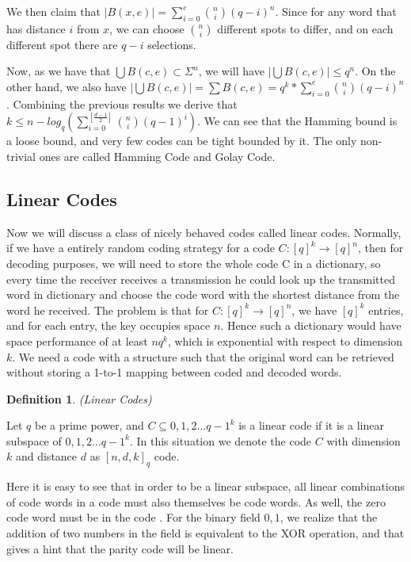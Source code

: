\documentclass{article}
\newtheorem{Definition}{Definition}
\begin{document}
We then claim that $|B(x,e)| = \sum_{i=0}^{e} {n \choose i}(q-i)^n$. Since for any word that has distance $i$ from $x$, we can choose ${n \choose i}$ different spots to differ, and on each different spot there are $q-i$ selections.

Now, as we have that $\bigcup B(c,e) \subset \Sigma^n$, we will have $|\bigcup B(c,e)| \le q^n$. On the other hand, we also have $|\bigcup B(c,e)| = \sum B(c,e) = q^k* \sum_{i=0}^{e} {n \choose i}(q-i)^n$. Combining the previous results we derive that $k \le n - log_q(\sum_{i=0}^{[\frac{d-1}{2}]}{n \choose i} (q-1)^i)$. We can see that the Hamming bound is a loose bound, and very few codes can be tight bounded by it. The only non-trivial ones are called Hamming Code and Golay Code.\\
\subsection{Linear Codes}
Now we will discuss a class of nicely behaved codes called linear codes. Normally, if we have a entirely random coding strategy for a code $C:[q]^k \rightarrow [q]^n$, then for decoding purposes, we will need to store the whole code C in a dictionary, so every time the receiver receives a transmission he could look up the transmitted word in dictionary and choose the code word with the shortest distance from the word he received. The problem is that for $C:[q]^k \rightarrow [q]^n$, we have $[q]^k$ entries, and for each entry, the key occupies space $n$. Hence such a dictionary would have space performance of at least $nq^k$, which is exponential with respect to dimension $k$. We need a code with a structure such that the original word can be retrieved without storing a 1-to-1 mapping between coded and decoded words.
\begin{Definition}(Linear Codes)\end{Definition}
\noindent Let $q$ be a prime power, and $C \subseteq {0,1,2...q-1}^k$ is a linear code if it is a linear subspace of ${0,1,2...q-1}^k$. In this situation we denote the code $C$ with dimension $k$ and distance $d$ as $[n,d,k]_q$ code.

Here it is easy to see that in order to be a linear subspace, all linear combinations of code words in a code must also themselves be code words. As well, the zero code word must be in the code . For the binary field ${0,1}$, we realize that the addition of two numbers in the field is equivalent to the XOR operation, and that gives a hint that the parity code will be linear.
\end{document}
